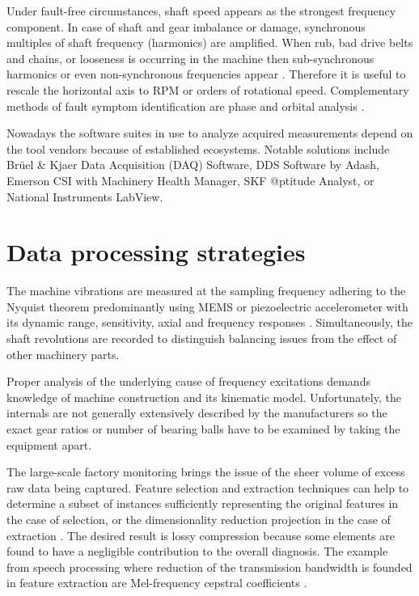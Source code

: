 \documentclass[11pt, a4paper, english]{article}
\begin{document}
\begin{refsection}
Under fault-free circumstances, shaft speed appears as the strongest frequency component. In case of shaft and gear imbalance or damage, synchronous multiples of shaft frequency (harmonics) are amplified. When rub, bad drive belts and chains, or looseness is occurring in the machine then sub-synchronous harmonics or even non-synchronous frequencies appear \cite{mohanty_machinery_2015}.  Therefore it is useful to rescale the horizontal axis to RPM or orders of rotational speed. Complementary methods of fault symptom identification are phase and orbital analysis \cite{scheffer_practical_2004}.

Nowadays the software suites in use to analyze acquired measurements depend on the tool vendors because of established ecosystems. Notable solutions include Brüel \& Kjaer Data Acquisition (DAQ) Software, DDS Software by Adash, Emerson CSI with Machinery Health Manager, SKF @ptitude Analyst, or National Instruments LabView.

\section{Data processing strategies}
The machine vibrations are measured at the sampling frequency adhering to the Nyquist theorem predominantly using MEMS or piezoelectric accelerometer with its dynamic range, sensitivity, axial and frequency responses  \cite{ziaran_technicka_2013}. Simultaneously, the shaft revolutions are recorded to distinguish balancing issues from the effect of other machinery parts. 

Proper analysis of the underlying cause of frequency excitations demands knowledge of machine construction and its kinematic model. Unfortunately, the internals are not generally extensively described by the manufacturers so the exact gear ratios or number of bearing balls have to be examined by taking the equipment apart.

The large-scale factory monitoring brings the issue of the sheer volume of excess raw data being captured. Feature selection and extraction techniques can help to determine a subset of instances sufficiently representing the original features in the case of selection, or the dimensionality reduction projection in the case of extraction \cite{kreidl_technicka_2006}. The desired result is lossy compression because some elements are found to have a negligible contribution to the overall diagnosis. The example from speech processing where reduction of the transmission bandwidth is founded in feature extraction are Mel-frequency cepstral coefficients \cite{rabiner_introduction_2007}.


\end{refsection}
\end{document}
